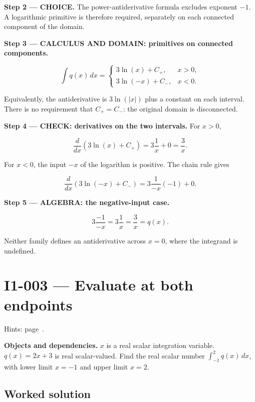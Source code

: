 \documentclass[11pt,oneside,openany]{book}
\begin{document}
\begin{ChoiceStep}
\textbf{Step 2 --- CHOICE.} The power-antiderivative formula excludes exponent \(-1\).
A logarithmic primitive is therefore required, separately on each connected
component of the domain.

\end{ChoiceStep}
\begin{DomainStep}
\textbf{Step 3 --- CALCULUS AND DOMAIN: primitives on connected components.}

\[
\int q(x)\,dx=
\begin{cases}
3\ln(x)+C_+,&x>0,\\
3\ln(-x)+C_-,&x<0.
\end{cases}
\]

Equivalently, the antiderivative is \(3\ln(|x|)\) plus a constant on each interval.
There is no requirement that \(C_+=C_-\): the original domain is disconnected.

\end{DomainStep}
\textbf{Step 4 --- CHECK: derivatives on the two intervals.} For \(x>0\),

\[
\frac{d}{dx}\left(3\ln(x)+C_+\right)=3\frac1x+0=\frac3x.
\]

For \(x<0\), the input \(-x\) of the logarithm is positive. The chain rule gives

\[
\frac{d}{dx}\left(3\ln(-x)+C_-\right)
=3\frac1{-x}(-1)+0.
\]

\begingroup\color{AlgebraBlue}
\textbf{Step 5 --- ALGEBRA: the negative-input case.}

\[
3\frac{-1}{-x}=3\frac1x=\frac3x=q(x).
\]

Neither family defines an antiderivative across \(x=0\), where the integrand is undefined.
\endgroup
\clearpage
\section{I1-003 --- Evaluate at both endpoints}
\label{problem:I1-003}
{\small Hints: page~\pageref{hints:I1-003}.}\par\medskip

\textbf{Objects and dependencies.} \(x\) is a real scalar integration variable.
\(q(x)=2x+3\) is real scalar-valued. Find the real scalar number
\(\int_{-1}^{2}q(x)\,dx\), with lower limit \(x=-1\) and upper limit \(x=2\).
\subsection*{Worked solution}
\end{document}
